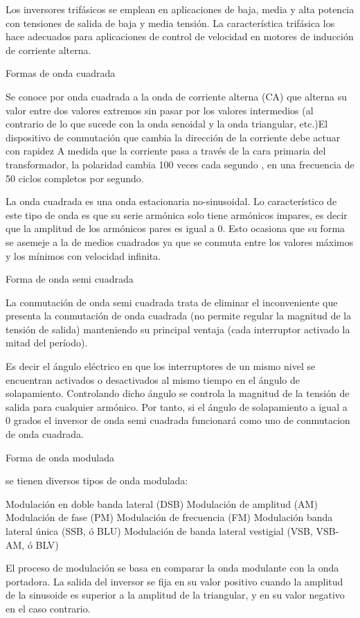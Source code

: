 \documentclass[10pt,a4paper]{article}
\begin{document}
Los inversores trifásicos se emplean en aplicaciones de baja, media y alta potencia con tensiones de salida de baja y media tensión.
La característica trifásica los hace adecuados para aplicaciones de control de velocidad en motores de inducción de corriente alterna.


Formas de onda cuadrada

Se conoce por onda cuadrada a la onda de corriente alterna (CA) que alterna su valor entre dos valores extremos sin pasar por los valores intermedios (al contrario de lo que sucede con la onda senoidal y la onda triangular, etc.)El dispositivo de conmutación que cambia la dirección de la corriente debe actuar con rapidez A medida que la corriente pasa a través de la cara primaria del transformador, la polaridad cambia 100 veces cada segundo  , en una frecuencia de 50 ciclos completos por segundo. 

La onda cuadrada es una onda estacionaria no-sinusoidal. Lo característico de este tipo de onda es que su serie armónica solo tiene armónicos impares, es decir que la amplitud de los armónicos pares es igual a 0. Esto ocasiona que su forma se asemeje a la de medios cuadrados ya que se conmuta entre los valores máximos y los mínimos con velocidad infinita.


Forma de onda semi cuadrada

La conmutación de onda semi cuadrada trata de eliminar el inconveniente que presenta la conmutación de onda cuadrada (no permite regular la magnitud de la tensión de salida) manteniendo su principal ventaja (cada interruptor activado la mitad del período).

Es decir el ángulo eléctrico en que los interruptores de un mismo nivel se encuentran activados o desactivados al mismo tiempo en el ángulo de solapamiento.  
Controlando dicho ángulo se controla la magnitud de la tensión de salida para cualquier armónico. 
 Por tanto, si el ángulo de solapamiento a igual a 0 grados el inversor de onda semi cuadrada funcionará como uno de conmutacion de onda cuadrada.


Forma de onda modulada

se tienen diversos tipos de onda modulada:

Modulación en doble banda lateral (DSB)
Modulación de amplitud (AM)
Modulación de fase (PM)
Modulación de frecuencia (FM)
Modulación banda lateral única (SSB, ó BLU)
Modulación de banda lateral vestigial (VSB, VSB-AM, ó BLV)

El proceso de modulación se basa en comparar la onda modulante con la onda portadora. La salida del inversor se fija en su valor positivo cuando la amplitud de la sinusoide es superior a la amplitud de la triangular,  y en su valor negativo en el caso contrario.
\end{document}
